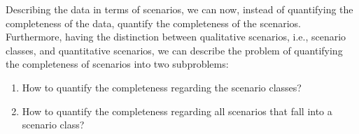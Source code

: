 Describing the data in terms of scenarios, we can now, instead of quantifying the completeness of the data, quantify the completeness of the scenarios. Furthermore, having the distinction between qualitative scenarios, i.e., scenario classes, and quantitative scenarios, we can describe the problem of quantifying the completeness of scenarios into two subproblems:
\begin{enumerate}
	\item How to quantify the completeness regarding the scenario classes?
	\item How to quantify the completeness regarding all scenarios that fall into a scenario class?
\end{enumerate}



